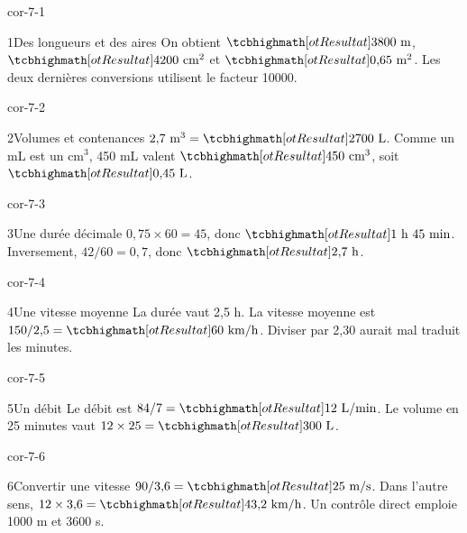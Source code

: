 \clearpage\pagestyle{otMain}\fontsize{11}{15}\selectfont{}
\begin{blocLivre}{cor-7-1}\begin{corrige}{1}{Des longueurs et des aires}
On obtient $\res{3800\text{ m}}$, $\res{4200\text{ cm}^2}$ et $\res{0{,}65\text{ m}^2}$. Les deux dernières conversions utilisent le facteur 10000.
\end{corrige}\end{blocLivre}
\begin{blocLivre}{cor-7-2}\begin{corrige}{2}{Volumes et contenances}
$2{,}7\text{ m}^3=\res{2700\text{ L}}$. Comme un mL est un cm$^3$, 450 mL valent $\res{450\text{ cm}^3}$, soit $\res{0{,}45\text{ L}}$.
\end{corrige}\end{blocLivre}
\begin{blocLivre}{cor-7-3}\begin{corrige}{3}{Une durée décimale}
$0{,}75\times60=45$, donc $\res{1\text{ h }45\text{ min}}$. Inversement, $42/60=0{,}7$, donc $\res{2{,}7\text{ h}}$.
\end{corrige}\end{blocLivre}
\begin{blocLivre}{cor-7-4}\begin{corrige}{4}{Une vitesse moyenne}
La durée vaut 2,5 h. La vitesse moyenne est $150/2{,}5=\res{60\text{ km/h}}$. Diviser par 2,30 aurait mal traduit les minutes.
\end{corrige}\end{blocLivre}
\begin{blocLivre}{cor-7-5}\begin{corrige}{5}{Un débit}
Le débit est $84/7=\res{12\text{ L/min}}$. Le volume en 25 minutes vaut $12\times25=\res{300\text{ L}}$.
\end{corrige}\end{blocLivre}
\begin{blocLivre}{cor-7-6}\begin{corrige}{6}{Convertir une vitesse}
$90/3{,}6=\res{25\text{ m/s}}$. Dans l’autre sens, $12\times3{,}6=\res{43{,}2\text{ km/h}}$. Un contrôle direct emploie 1000 m et 3600 s.
\end{corrige}\end{blocLivre}
